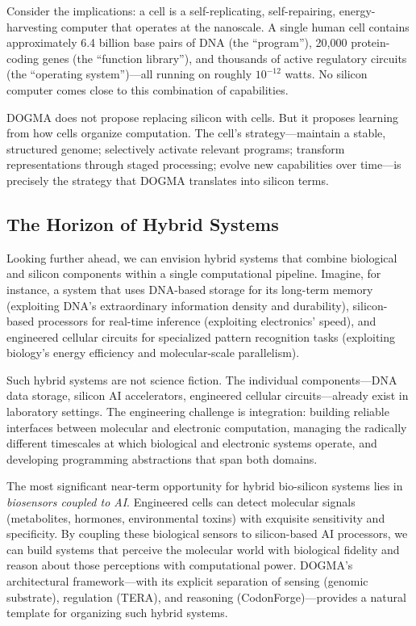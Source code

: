 Consider the implications: a cell is a self-replicating, self-repairing, energy-harvesting computer that operates at the nanoscale. A single human cell contains approximately 6.4 billion base pairs of DNA (the ``program''), 20,000 protein-coding genes (the ``function library''), and thousands of active regulatory circuits (the ``operating system'')---all running on roughly $10^{-12}$ watts. No silicon computer comes close to this combination of capabilities.

DOGMA does not propose replacing silicon with cells. But it proposes learning from how cells organize computation. The cell's strategy---maintain a stable, structured genome; selectively activate relevant programs; transform representations through staged processing; evolve new capabilities over time---is precisely the strategy that DOGMA translates into silicon terms.

\subsection{The Horizon of Hybrid Systems}

Looking further ahead, we can envision hybrid systems that combine biological and silicon components within a single computational pipeline. Imagine, for instance, a system that uses DNA-based storage for its long-term memory (exploiting DNA's extraordinary information density and durability), silicon-based processors for real-time inference (exploiting electronics' speed), and engineered cellular circuits for specialized pattern recognition tasks (exploiting biology's energy efficiency and molecular-scale parallelism).

Such hybrid systems are not science fiction. The individual components---DNA data storage, silicon AI accelerators, engineered cellular circuits---already exist in laboratory settings. The engineering challenge is integration: building reliable interfaces between molecular and electronic computation, managing the radically different timescales at which biological and electronic systems operate, and developing programming abstractions that span both domains.

\begin{implnote}
The most significant near-term opportunity for hybrid bio-silicon systems lies in \emph{biosensors coupled to AI}. Engineered cells can detect molecular signals (metabolites, hormones, environmental toxins) with exquisite sensitivity and specificity. By coupling these biological sensors to silicon-based AI processors, we can build systems that perceive the molecular world with biological fidelity and reason about those perceptions with computational power. DOGMA's architectural framework---with its explicit separation of sensing (genomic substrate), regulation (TERA), and reasoning (CodonForge)---provides a natural template for organizing such hybrid systems.
\end{implnote}

